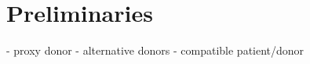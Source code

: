 \chapter{Preliminaries}
\label{cha:preliminaries}

- proxy donor
- alternative donors
- compatible patient/donor